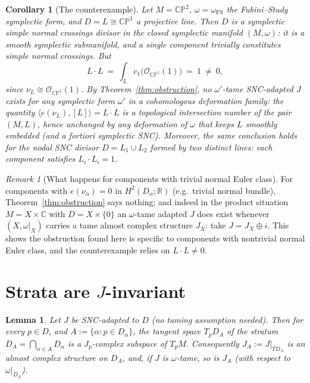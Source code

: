 \documentclass[11pt]{article}
\newtheorem{lemma}[theorem]{Lemma}
\newtheorem{corollary}[theorem]{Corollary}
\theoremstyle{definition}
\theoremstyle{remark}
\newtheorem{remark}[theorem]{Remark}
\newcommand{\CC}{\mathbb{C}}
\newcommand{\RR}{\mathbb{R}}
\newcommand{\CP}{\mathbb{CP}}
\begin{document}
\begin{corollary}[The counterexample]\label{cor:cp2}
Let $M=\CP^2$, $\omega=\omega_{\mathrm{FS}}$ the Fubini--Study
symplectic form, and $D=L\cong\CP^1$ a projective line. Then $D$ is
a symplectic simple normal crossings divisor in the closed symplectic
manifold $(M,\omega)$: it is a smooth symplectic submanifold, and a
single component trivially constitutes simple normal crossings. But
\[
L\cdot L\ =\ \int_L c_1\bigl(\mathcal O_{\CP^1}(1)\bigr)\ =\ 1
\ \neq\ 0 ,
\]
since $\nu_L\cong\mathcal O_{\CP^1}(1)$. By
Theorem~\ref{thm:obstruction}, no $\omega'$-tame SNC-adapted $J$
exists for \emph{any} symplectic form $\omega'$ in a cohomologous
deformation family: the quantity $\langle e(\nu_L),[L]\rangle=L\cdot
L$ is a topological intersection number of the pair $(M,L)$, hence
unchanged by any deformation of $\omega$ that keeps $L$ smoothly
embedded (and a fortiori symplectic SNC). Moreover, the same
conclusion holds for the nodal SNC divisor $D=L_1\cup L_2$ formed by
two distinct lines: each component satisfies
$L_i\cdot L_i=1$.
\end{corollary}



\begin{remark}[What happens for components with trivial normal Euler
class]
For components with $e(\nu_\alpha)=0$ in $H^2(D_\alpha;\RR)$ (e.g.\
trivial normal bundle), Theorem~\ref{thm:obstruction} says nothing;
and indeed in the product situation $M=X\times\CC$ with
$D=X\times\{0\}$ an $\omega$-tame adapted $J$ does exist whenever
$(X,\omega|_X)$ carries a tame almost complex structure $J_X$: take
$J=J_X\oplus i$. This shows the obstruction found here is specific
to components with nontrivial normal Euler class, and the
counterexample relies on $L\cdot L\neq0$.
\end{remark}

\section{Strata are $J$-invariant}\label{sec:strata}

\begin{lemma}\label{lem:strata}
Let $J$ be SNC-adapted to $D$ (no taming assumption needed). Then
for every $p\in D$, and $A:=\{\alpha:p\in D_\alpha\}$, the tangent
space $T_pD_A$ of the stratum $D_A=\bigcap_{\alpha\in A}D_\alpha$
is a $J_p$-complex subspace of $T_pM$. Consequently
$J_A:=J|_{TD_A}$ is an almost complex structure on $D_A$, and, if
$J$ is $\omega$-tame, so is $J_A$ (with respect to
$\omega|_{D_A}$).
\end{lemma}
\end{document}
